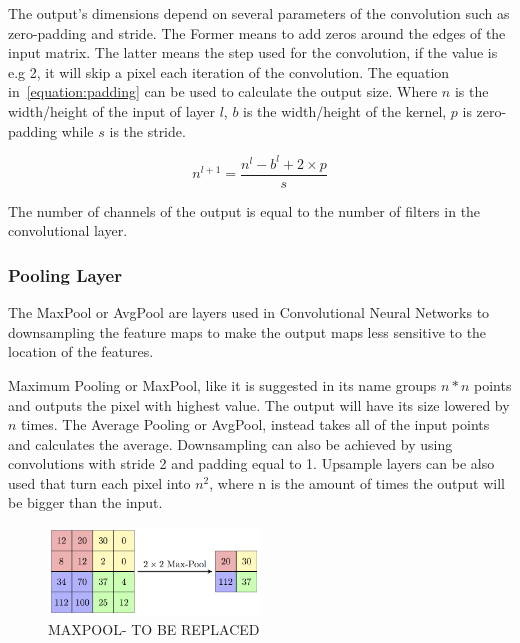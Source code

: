 The output's dimensions depend on several parameters of the convolution such as zero-padding and stride. The Former means to add zeros around the edges
of the input matrix. The latter means the step used for the convolution, if the value is e.g 2, it will skip a pixel each iteration of the convolution.
The equation in~\ref{equation:padding} can be used to calculate the output size. Where $n$ is the width/height of the input of layer $l$,
$ b$ is the width/height of the kernel, $p$ is  zero-padding while $s$ is the stride.

\begin{equation} \label{equation:padding}
     n^{l+1} = \frac{n^{l}- b^{l}+2 \times p}{s}
\end{equation}

The number of channels of the output is equal to the number of filters
in the convolutional layer.




\subsubsection{Pooling Layer}

\quad The MaxPool or AvgPool are layers used in Convolutional Neural Networks to downsampling the feature maps to make 
the output maps less sensitive to the location of the features.

Maximum Pooling or MaxPool, like it is suggested in its name groups $ n * n $ points and outputs the pixel with highest value.
 The output will have its size lowered by $ n $ times.
The Average Pooling or AvgPool, instead takes all of the input points and calculates the average. Downsampling can also be achieved by using convolutions with stride 2 and padding equal to 1.
Upsample layers can be also used that turn each pixel into $ n^{2} $, where n is the amount of times the output will be bigger than the input.

\begin{figure}[!htbp]
    \centering
    \includegraphics[width=0.5\textwidth]{Figures/maxpool.png}
    \caption{MAXPOOL- TO BE REPLACED}
    \label{figure:maxpool}
\end{figure} 
 

